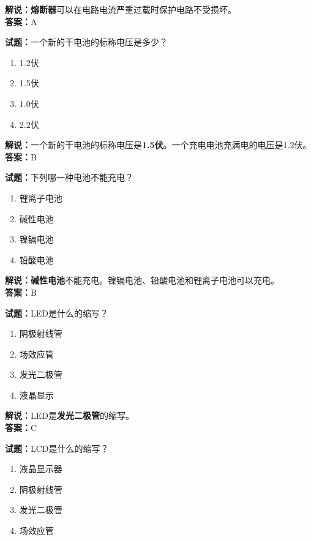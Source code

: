 \documentclass{ctexbook}
\begin{document}
\noindent\textbf{解说：熔断器}可以在电路电流严重过载时保护电路不受损坏。\\\noindent\textbf{答案：}A
\bigskip


\noindent\textbf{试题：}一个新的干电池的标称电压是多少？

\begin{enumerate}[leftmargin=3em]
	\item 1.2伏
	\item 1.5伏
	\item 1.0伏
	\item 2.2伏
\end{enumerate}

\noindent\textbf{解说：}一个新的干电池的标称电压是\textbf{1.5伏}。一个充电电池充满电的电压是1.2伏。\\\noindent\textbf{答案：}B

\bigskip


\noindent\textbf{试题：}下列哪一种电池不能充电？

\begin{enumerate}[leftmargin=3em]
	\item 锂离子电池
	\item 碱性电池
	\item 镍镉电池
	\item 铅酸电池
\end{enumerate}

\noindent\textbf{解说：碱性电池}不能充电。镍镉电池、铅酸电池和锂离子电池可以充电。\\\noindent\textbf{答案：}B
\bigskip


\noindent\textbf{试题：}LED是什么的缩写？

\begin{enumerate}[leftmargin=3em]
	\item 阴极射线管
	\item 场效应管
	\item 发光二极管
	\item 液晶显示
\end{enumerate}

\noindent\textbf{解说：}LED是\textbf{发光二极管}的缩写。\\\noindent\textbf{答案：}C

\bigskip


\noindent\textbf{试题：}LCD是什么的缩写？

\begin{enumerate}[leftmargin=3em]
	\item 液晶显示器
	\item 阴极射线管
	\item 发光二极管
	\item 场效应管
\end{enumerate}
\end{document}
